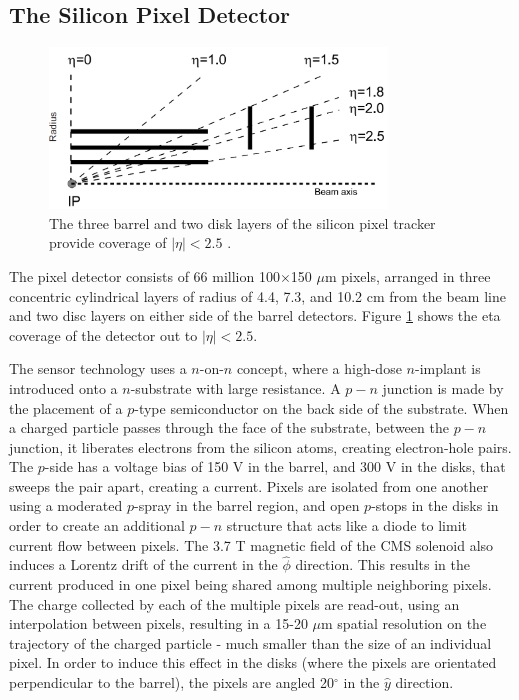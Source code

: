\subsection{The Silicon Pixel Detector}
\label{tracker_pixel_description}

\begin{figure}[h]
   \centering
  \includegraphics[width=0.8\textwidth]{Figures/CMS_Diagrams/Tracker__Pixel_Rapidity.png}
  \caption{The three barrel and two disk layers of the silicon pixel
    tracker provide coverage of $|\eta|<2.5$ \cite{CMS:CMS_Machine_Chatrchyan:2008aa}. } \label{fig:tracker_pixel_eta_coverage}
\end{figure}

\par The pixel detector consists of 66 million 100$\times$150 $\mu$m
pixels, arranged in three concentric cylindrical layers of radius of
4.4, 7.3, and 10.2 cm from the beam line and two disc layers on either
side of the barrel detectors.  Figure
\ref{fig:tracker_pixel_eta_coverage} shows the eta coverage of the
detector out to $|\eta|<2.5$.   

\par The sensor technology uses a $n$-on-$n$ concept, where a
high-dose $n$-implant is introduced onto a $n$-substrate with large
resistance.  A $p-n$ junction is made by the placement of a $p$-type
semiconductor on the back side of the substrate.  When a charged
particle passes through the face of the substrate, between the $p-n$
junction, it liberates electrons from the silicon atoms, creating 
electron-hole pairs.  The $p$-side has a voltage bias of 150 V in the
barrel, and 300 V in the disks, that sweeps the pair apart, creating a
current.  Pixels are isolated from one another using a moderated
$p$-spray in the barrel region, and open $p$-stops in the disks in
order to create an additional $p-n$ structure that acts like a diode
to limit current flow between pixels.  The 3.7 T magnetic
field of the CMS solenoid also induces a Lorentz drift of the current
in the $\hat{\phi}$ direction.  This results in the current produced
in one pixel being shared among multiple neighboring pixels.  The
charge collected by each of the multiple pixels are read-out, using an
interpolation between pixels, resulting in a 15-20 $\mu$m spatial resolution
on the trajectory of the charged particle - much smaller than the size
of an individual pixel.  In order to induce this effect in the disks
(where the pixels are orientated perpendicular to the barrel), the
pixels are angled 20$^{\circ}$ in the $\hat{y}$ direction. 

